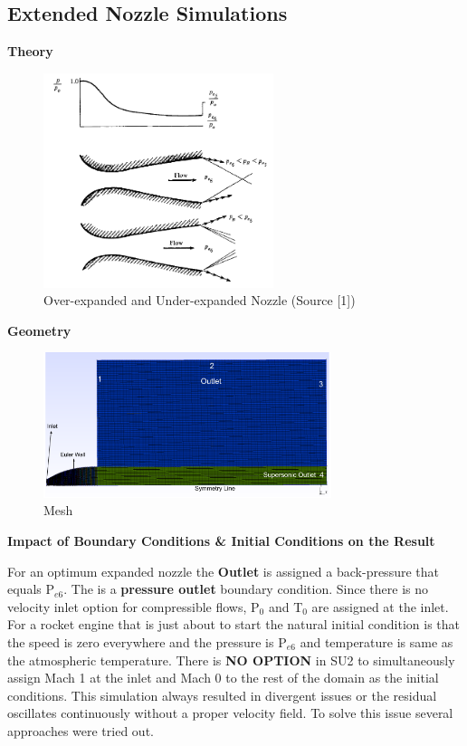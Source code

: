 \subsection{Extended Nozzle Simulations}
\textbf{Theory}\\
\begin{figure}[H]
    \centering
    \includegraphics[width=0.6\textwidth]{text/Nozzles_Expansions.PNG}
    \caption[Over-expanded and Under-expanded Nozzle]{Over-expanded and Under-expanded Nozzle (Source [1])}
    \label{fig:Over-expanded and Under-expanded Nozzle}
\end{figure}
\textbf{Geometry}\\
\begin{figure}[H]
    \centering
    \includegraphics[width=0.75\textwidth]{text/Failed_BC.png}
    \caption[Extended Mesh of Nozzle Simulation]{Mesh}
    \label{fig:Mesh}
\end{figure}
\begin{flushleft}
\textbf{Impact of Boundary Conditions \& Initial Conditions on the Result}
\end{flushleft}
For an optimum expanded nozzle the \textbf{Outlet} is assigned a back-pressure that equals P$_{e6}$. The is a \textbf{pressure outlet} boundary condition. Since there is no velocity inlet option for compressible flows, P$_0$ and T$_0$ are assigned at the inlet. For a rocket engine that is just about to start the natural initial condition is that the speed is zero everywhere and the pressure is P$_{e6}$ and temperature is same as the atmospheric temperature. There is \textbf{NO OPTION} in SU2 to simultaneously assign Mach 1 at the inlet and Mach 0 to the rest of the domain as the initial conditions. This simulation always resulted in divergent issues or the residual oscillates continuously without a proper velocity field. To solve this issue several approaches were tried out.\\
